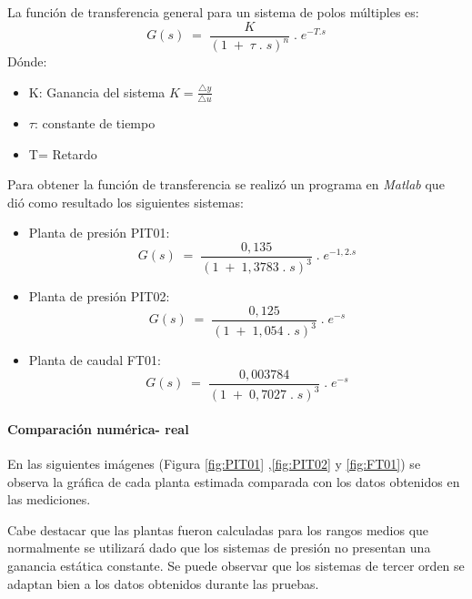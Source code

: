{La función de transferencia general para un sistema de polos múltiples es:
\begin{equation}
	G(s)\;=\;\frac K{(1\;+\;\tau\;.\;s)^n}\;.\;e^{-T.s}
\end{equation}
Dónde:
\begin{itemize}
	\item K:  Ganancia del sistema $K = \frac{\triangle y}{\triangle u}$
	\item $\tau$: constante de tiempo
	\item T= Retardo
\end{itemize}
Para obtener la función de transferencia se realizó un programa en \textit{Matlab} que dió como resultado los siguientes sistemas:
\begin{itemize}
	\item Planta de presión PIT01:
	\begin{equation}
	 G(s)\;=\;\frac {0,135}{(1\;+\;1,3783\;.\;s)^3}\;.\;e^{-1,2.s}
	\end{equation}
	\item Planta de presión PIT02: 	
	\begin{equation}
		G(s)\;=\;\frac {0,125}{(1\;+\;1,054\;.\;s)^3}\;.\;e^{-s}
	\end{equation}
	\item Planta de caudal FT01:
		\begin{equation}
		G(s)\;=\;\frac {0,003784}{(1\;+\;0,7027\;.\;s)^3}\;.\;e^{-s}
	\end{equation}
\end{itemize}

\paragraph{Comparación numérica- real}
En las siguientes imágenes (Figura \ref{fig:PIT01} ,\ref{fig:PIT02} y \ref{fig:FT01}) se observa la gráfica de cada planta estimada comparada con los datos obtenidos en las mediciones.
\begin{comment}
$C:\Users\glori\Desktop\DANIELA\VISUAL_DANI\Automa\MATLAB\Prueba_PLANTA\Imaagenes Calculo Plantas\FIT001
Strenj_RESPUESTA.png$
\end{comment}

Cabe destacar que las plantas fueron calculadas para los rangos medios que normalmente se utilizará dado que los sistemas de presión no presentan una ganancia estática constante.
Se puede observar que los sistemas de tercer orden se adaptan bien a los datos obtenidos durante las pruebas.
\begin{comment}
no borrar opr las dudas que quisimos poner esto
 

\end{comment}}
